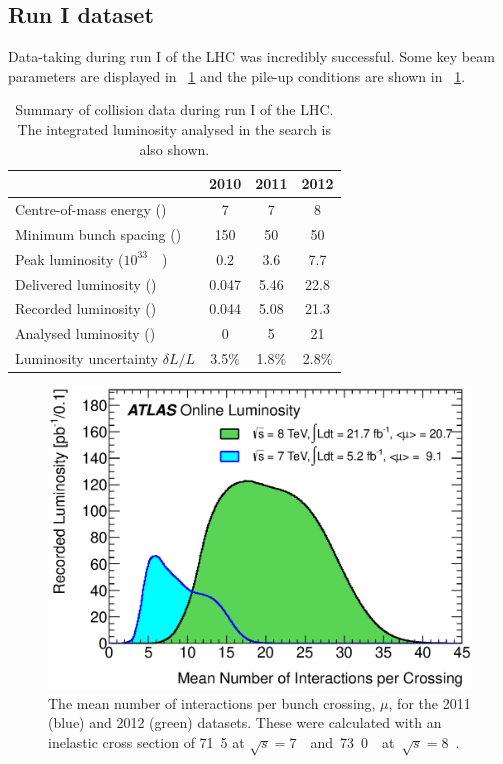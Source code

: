 \subsection{Run I dataset}
\label{sec:dataset:dataset}

Data-taking during run I of the LHC was incredibly successful. Some key beam parameters are
displayed in \Table~\ref{tab:dataset} and the pile-up conditions are shown in 
\Figure~\ref{fig:pileup}.

\begin{table}[h]
	\begin{tabular}{lc@{\hskip 0.25in}c@{\hskip 0.25in}c}
	& 2010 & 2011 & 2012 \\
	\hline
	Centre-of-mass energy (\TeV)         & 7 & 7 & 8 \\
	Minimum bunch spacing (\nano\second) & 150 & 50 & 50 \\
	Peak luminosity (\unit{$10^{33}$}{\lumiunits}) & 0.2 & 3.6 & 7.7 \\
	Delivered luminosity (\invfb)       & 0.047 & 5.46 & 22.8 \\
	Recorded luminosity (\invfb)        & 0.044 & 5.08 & 21.3 \\
	Analysed luminosity (\invfb)        & 0     & 5 & 21 \\
	Luminosity uncertainty $\delta L/L$ & 3.5\% & 1.8\% & 2.8\% \\
	\end{tabular}
	\caption{Summary of \pp collision data during run I of the \ac{LHC}. The integrated luminosity analysed in the \HWW search is also shown.}
	\label{tab:dataset}
\end{table}

\begin{figure}[h]
	\includegraphics[width=\mediumfigwidth]{tex/experiment/pileup}
	\caption{The mean number of interactions per bunch crossing, $\mu$, for the 2011 (blue)
	and 2012 (green) datasets. These were calculated with an inelastic \pp cross 
	section of \unit{71.5}{\milli\barn} at \unit{$\sqrt{s} = 7$}{\TeV} and 
	\unit{73.0}{\milli\barn} at \unit{$\sqrt{s} = 8$}{\TeV}.}
	\label{fig:pileup}
\end{figure}

